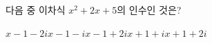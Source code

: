 다음 중 이차식 $x^2+2x+5$의 인수인 것은?
\begin{choices32}{$x-1-2i$}{$x-1-i$}{$x-1+2i$}{$x+1+i$}{$x+1+2i$}\end{choices32}

